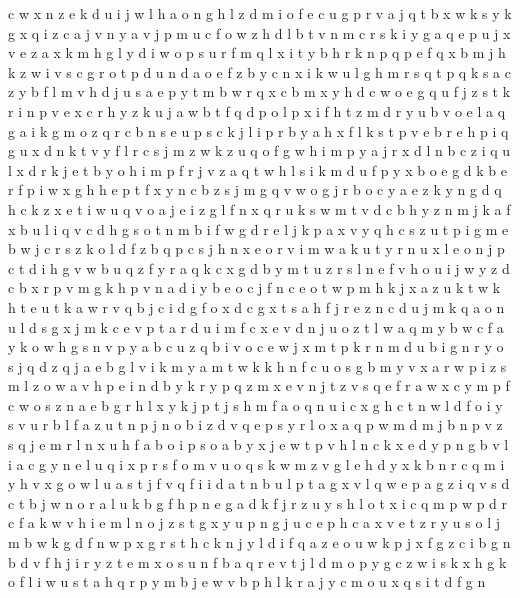 \documentclass{article}
\begin{document}
c w x n
z e k d u i j w l h a o n g
h l z d m i o f e c u g p r v a j q t b x w k s y
k g x q i z c a j v n y
a v j p m u c f o
w z h d l b t v n m c r s k i y g a q e p u j x
v e z a x k m h g l y d i w o p s u r f
m q l x i t y b h r k n p
q p e
f q x b m j h k z w i v s c g r o t p d u n
d a o e f z b y c n x i k w u l g h m r s q t p
q k s a
c z y b f l m v h d j
u s a e p y t m b w r
q x c
b m x y h d c w o e g q u f j z s t k r i n p v
e x c r h y z k u j a w b t f q d p o l
p x i f h t z m d r y u b v o e l a q g
a i k g m o z q r c b n s e u p
s c k j l i p r b
y
a h x f l k s t p v e b r
e h p i q g u x d n k t v y f l r c s j m z w
k z u
q o f g w h i m p y a j r x d l n b c
z i
q u l x d r k j e t b y o h i m p f
r j v z a q t w h l s i k m d u f p y x b o e g
d k b e r f p i w x g h
h e p t f x y n c b z s j m g q v w o
g j r b o c y
a e z k y
n g d q h c k z x e t i
w u q v
o a j e i z g l f n x q r u k s w m t v d c b h
y z n m j k a f x b u l i q v c d h g s o t
n m b i f w g d r e l j k p a x v y q h c s z u t
p i g m e b w j c r s z k o
l d f z b q p c s j h n x e o r v i m w a k u t y
r n u
x l e o n j p c t d i h g v w b u q z f y r
a q k c x g d b y m t u z r s l n e f v h o
u i j w y z d c b x r p v m
g k h p v n a d i y b e o c j f
n c e o t w p m h k j x a
z u k t w
k h t
e u t k a w r v q b j c i d g f o x
d c g x t s a h f j r e z n
c d u j m k q a o n
u
l d
s g x j m k c e v p t a r d u i
m f c x e v d n j u o z t
l w a q m y b
w c f a y k o
w h g s n v p y a b c
u z q b i v o c e w j x m t p k r n
m d u b i g n r y o s j q
d z q j a e b g l v i k m y
a m t w k
k h n f c u o s g b m y v x a r w p i z
s m l z o w a v h p e i n d b y k r
y p q z m x
e v n
j t z v s q e f r a w x c y m
p f c w o s z n a e b g r h l x y k j
p t j s h m f a o q n u i c x g
h c t n w l d f o i y s v u
r b l f a z u t n p
j n o b i z d v q e p s y r l
o x a q p
w m
d m j b n p
v z s q j e m r l n x u h f a b o i p
s o a b y x j e w t p v h l n
c k x e d y p n g b v l i
a c g y n e l u q i x p r s f o m v
u o q s k w m z v g l e h d y x
k
b n r c q m i y h v x g o w l u a s t j f
v q f i
i d a t n b u l p
t a g x v l q w
e p a g z i q v s d c t b j w
n o r a l u k b g f h p
n e g a d k f j r z u y s h l o t x i c q m p w
p d r c f a k w v h i e m l n o j z s t g x y u
p n g j u c e
p h c a x v e t z r y u s o l j m b w k g d f n
w p x g r s t h c k n j y l d i f q a z e o u
w k p j x f g z c i b
g n b d v f h j i r y z t e m x o s
u n f b a q r e v t j l d m o p y g c z w i s k x h
g k o f l i w u s t a h q r p y m b j e
w v b p h l k r a j y c m o u x q s i t d f g n
\end{document}
